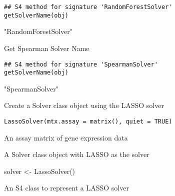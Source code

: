 \documentclass[a4paper]{book}
\begin{document}
%
\begin{Usage}
\begin{verbatim}
## S4 method for signature 'RandomForestSolver'
getSolverName(obj)
\end{verbatim}
\end{Usage}
%
\begin{Value}
"RandomForestSolver"
\end{Value}
%
\begin{Description}\relax
Get Spearman Solver Name
\end{Description}
%
\begin{Usage}
\begin{verbatim}
## S4 method for signature 'SpearmanSolver'
getSolverName(obj)
\end{verbatim}
\end{Usage}
%
\begin{Value}
"SpearmanSolver"
\end{Value}
%
\begin{Description}\relax
Create a Solver class object using the LASSO solver
\end{Description}
%
\begin{Usage}
\begin{verbatim}
LassoSolver(mtx.assay = matrix(), quiet = TRUE)
\end{verbatim}
\end{Usage}
%
\begin{Arguments}
\begin{ldescription}
\item[\code{mtx.assay}] An assay matrix of gene expression data
\end{ldescription}
\end{Arguments}
%
\begin{Value}
A Solver class object with LASSO as the solver
\end{Value}
%
\begin{Examples}
\begin{ExampleCode}
solver <- LassoSolver()
\end{ExampleCode}
\end{Examples}
%
\begin{Description}\relax
An S4 class to represent a LASSO solver
\end{Description}
\end{document}
